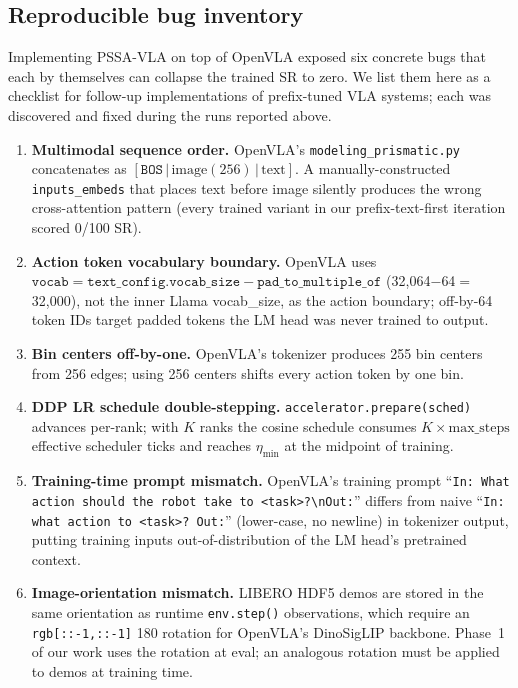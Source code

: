 \documentclass[10pt,letterpaper]{article}
\newcommand{\method}{\textsc{PSSA-VLA}\xspace}
\begin{document}
\subsection{Reproducible bug inventory}
\label{sec:exp_bugs}

Implementing \method on top of OpenVLA exposed six concrete bugs that
each by themselves can collapse the trained SR to zero. We list them
here as a checklist for follow-up implementations of prefix-tuned VLA
systems; each was discovered and fixed during the runs reported above.

\begin{enumerate}
\item \textbf{Multimodal sequence order.} OpenVLA's
\texttt{modeling\_prismatic.py} concatenates as
$[\texttt{BOS}\,|\,\text{image}(256)\,|\,\text{text}]$.
A manually-constructed
\texttt{inputs\_embeds} that places text before image silently produces
the wrong cross-attention pattern (every trained variant in our
prefix-text-first iteration scored 0/100 SR).
\item \textbf{Action token vocabulary boundary.} OpenVLA uses
$\texttt{vocab}{=}\texttt{text\_config.vocab\_size}-\texttt{pad\_to\_multiple\_of}$
(32{,}064$-$64$=$32{,}000), not the inner Llama vocab\_size, as the action
boundary; off-by-64 token IDs target padded tokens the LM head was never
trained to output.
\item \textbf{Bin centers off-by-one.} OpenVLA's tokenizer produces 255 bin
centers from 256 edges; using 256 centers shifts every action token by
one bin.
\item \textbf{DDP LR schedule double-stepping.} \texttt{accelerator.prepare(sched)}
advances per-rank; with $K$ ranks the cosine schedule consumes
$K\!\times\!\text{max\_steps}$ effective scheduler ticks and reaches
$\eta_{\min}$ at the midpoint of training.
\item \textbf{Training-time prompt mismatch.} OpenVLA's training prompt
``\texttt{In: What action should the robot take to <task>?\textbackslash nOut:}''
differs from naive ``\texttt{In: what action to <task>? Out:}'' (lower-case,
no newline) in tokenizer output, putting training inputs out-of-distribution
of the LM head's pretrained context.
\item \textbf{Image-orientation mismatch.} LIBERO HDF5 demos are stored in
the same orientation as runtime \texttt{env.step()} observations, which
require an \texttt{rgb[::-1,::-1]} 180\textdegree{} rotation for OpenVLA's
DinoSigLIP backbone. Phase~1 of our work uses the rotation at eval; an
analogous rotation must be applied to demos at training time.
\end{enumerate}
\end{document}
